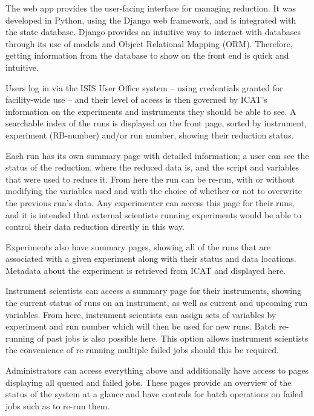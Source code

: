 \documentclass[twocolumn]{article}
\begin{document}
The web app provides the user-facing interface for managing reduction.
It was developed in Python, using the Django web framework, and is
integrated with the state database. Django provides an intuitive way to
interact with databases through its use of models and Object Relational Mapping (ORM).
Therefore, getting information from the database to show on the front end is 
quick and intuitive. 

Users log in via the ISIS User Office system -- using credentials 
granted for facility-wide use -- and their level of access is then 
governed by ICAT's \cite{icat} information on the experiments and instruments they 
should be able to see. A searchable index of the runs is displayed on the front page, sorted
by instrument, experiment (RB-number) and/or run number, showing their reduction
status.

Each run has its own summary page with detailed information; a user can
see the status of the reduction, where the reduced data is, and the
script and variables that were used to reduce it. From here the run can
be re-run, with or without modifying the variables used and with the choice
of whether or not to overwrite the previous run's data. Any
experimenter can access this page for their runs, and it is intended that
external scientists running experiments would be able to control their data
reduction directly in this way.

Experiments also have summary pages, showing all of the runs that are
associated with a given experiment along with their status and data
locations. Metadata about the experiment is retrieved from ICAT and
displayed here.

Instrument scientists can access a summary page for their instruments,
showing the current status of runs on an instrument, as well as current
and upcoming run variables. From here, instrument scientists can assign
sets of variables by experiment and run number which will then be used
for new runs. Batch re-running of past jobs is also possible here. 
This option allows instrument scientists the convenience of re-running multiple 
failed jobs should this be required. 

Administrators can access everything above and additionally have access
to pages displaying all queued and failed jobs. These pages provide an
overview of the status of the system at a glance and have controls for
batch operations on failed jobs such as to re-run them.
\end{document}
